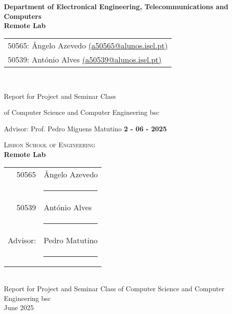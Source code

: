 \documentclass[report,a4paper,openright,twoside,11pt]{report}
\begin{document}
\thispagestyle{empty}

\begin{titlepage}
  \begin{center}
    \begin{minipage}[l]{\textwidth}
        \hspace{-15mm}\\
    \end{minipage}\\[10mm]
    {\large \textbf{Department of Electronical Engineering, Telecommunications and Computers}\\[1.5cm]}
    {\Huge \textbf{Remote Lab}\\[2cm]}    
    {\large \begin{tabular}{l}
      50565: Ângelo Azevedo \href{mailto:a50565@alunos.isel.pt}{(a50565@alunos.isel.pt)}\\
      50539: António Alves \href{mailto:a50539@alunos.isel.pt}{(a50539@alunos.isel.pt)}\\
    \end{tabular}\\[3cm] }
    {\large Report for Project and Seminar Class
    
    of Computer Science and Computer Engineering \acs{bsc}\\[3cm]}
    {\large Advisor: Prof. Pedro Miguens Matutino}   
    \vfill
    {\large \textbf{2 - 06 - 2025}}   
  \end{center}
\end{titlepage}

\baselineskip 18pt %

\newpage
\thispagestyle{empty}

\cleardoublepage
\begin{center}
\textsc{\LARGE Lisbon School of Engineering}\\[15mm]

{\Large \bf  Remote Lab}\\[20mm]

\begin{tabular}{rl}
  50565  & Ângelo Azevedo\\[10mm]
           & \rule{75mm}{0.5pt}\\[5mm]

  50539  & António Alves\\[10mm]
           & \rule{75mm}{0.5pt}\\[5mm]

  Advisor: & Pedro Matutino\\[10mm]
      & \rule{75mm}{0.5pt}\\[5mm]
\end{tabular}\\[5cm]
{\large Report for Project and Seminar Class of Computer Science and Computer Engineering \acs{bsc}\\[3cm]}
June 2025\\
\end{center}
\end{document}
